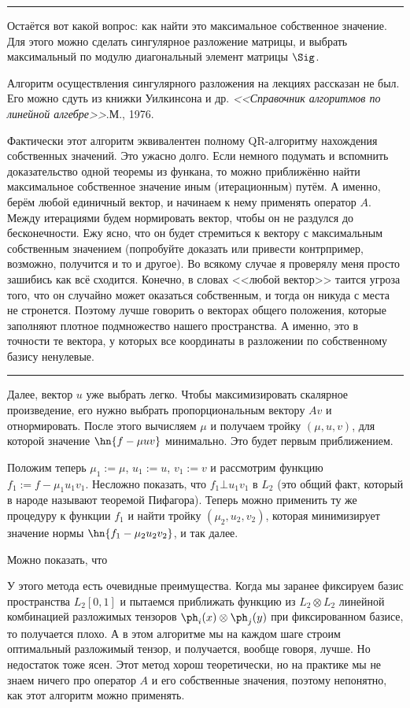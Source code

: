 \documentclass[a4paper]{article}
\newenvironment{petit}{\medskip\hrule\smallskip\footnotesize}{\par\smallskip\hrule\medskip}
\begin{document}
\begin{petit}
Остаётся вот какой вопрос: как найти это максимальное собственное значение. Для этого можно сделать сингулярное
разложение матрицы, и выбрать максимальный по модулю диагональный элемент матрицы $\Sig$.

Алгоритм осуществления сингулярного разложения на лекциях рассказан не был. Его можно сдуть из книжки
Уилкинсона и др. \emph{<<Справочник алгоритмов по линейной алгебре>>}.\т М., 1976.

Фактически этот алгоритм эквивалентен полному QR-алгоритму нахождения собственных значений. Это ужасно долго.
Если немного подумать и вспомнить доказательство одной теоремы из функана, то можно приближённо найти максимальное
собственное значение иным (итерационным) путём. А именно, берём любой единичный вектор, и начинаем  к нему применять оператор $A$.
Между итерациями будем нормировать вектор, чтобы он не раздулся до бесконечности. Ежу ясно, что он будет стремиться к вектору с
максимальным собственным значением (попробуйте доказать или привести контрпример, возможно, получится и то и другое).
Во всякому случае я проверял\т у  меня просто зашибись как всё сходится. Конечно, в словах <<любой вектор>> таится угроза того,
что он случайно может оказаться собственным, и тогда он никуда с места не стронется. Поэтому лучше говорить о векторах
общего положения, которые заполняют плотное подмножество нашего пространства. А именно, это в точности те вектора, у которых все
координаты в разложении по собственному базису ненулевые.
\end{petit}

Далее, вектор $u$ уже выбрать легко. Чтобы максимизировать скалярное произведение, его нужно выбрать
пропорциональным вектору $Av$ и отнормировать. После этого вычисляем $\mu$ и получаем тройку $(\mu, u,v)$,
для которой значение $\hn{f - \mu u v}$ минимально. Это будет первым приближением.

Положим теперь $\mu_1 := \mu$, $u_1 := u$, $v_1 := v$ и рассмотрим функцию $f_1 := f - \mu_1u_1v_1$.
Несложно показать, что $f_1 \bot u_1v_1$ в $L_2$ (это общий факт, который в народе называют теоремой
Пифагора). Теперь можно применить ту же процедуру к функции $f_1$ и найти тройку $(\mu_2,u_2,v_2)$,
которая минимизирует значение нормы $\hn{f_1 - \mu_2 u_2 v_2}$, и так далее.

Можно показать, что

У этого метода есть очевидные преимущества. Когда мы заранее фиксируем базис пространства $L_2[0,1]$
и пытаемся приближать функцию из $L_2\otimes L_2$ линейной комбинацией разложимых тензоров $\ph_i(x)\otimes \ph_j(y)$
при фиксированном базисе, то получается плохо. А в этом алгоритме мы на каждом шаге строим оптимальный разложимый тензор,
и получается, вообще говоря, лучше. Но недостаток тоже ясен. Этот метод хорош теоретически, но на практике
мы не знаем ничего про оператор $A$ и его собственные значения, поэтому непонятно, как этот алгоритм можно применять.
\end{document}
